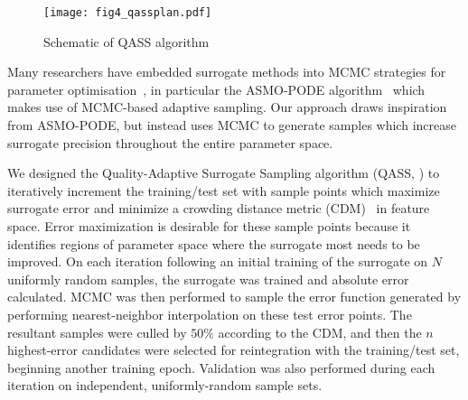 \begin{figure}
	\centering
	\hspace*{-5pt}\texttt{[image: fig4\_qassplan.pdf]}
	\caption{\label{fig:qassplan}Schematic of QASS algorithm}
\end{figure}

Many researchers have embedded surrogate methods into MCMC strategies for
parameter optimisation~\cite{Zhang2020,Gong2017}, in particular the ASMO-PODE
algorithm~\cite{Ginting2011} which makes use of MCMC-based adaptive sampling. Our approach draws inspiration from ASMO-PODE, but instead uses MCMC to generate samples
which increase surrogate precision throughout the entire parameter space.

We designed the Quality-Adaptive Surrogate Sampling algorithm (QASS, ) to iteratively increment the training/test set with sample
points which maximize surrogate error and minimize a crowding distance metric
(CDM)~\cite{Solonen2012} in feature space. Error maximization is desirable for these sample points because it identifies regions of parameter space where the surrogate most needs to be improved. On each iteration following an initial training of the surrogate on $N$ uniformly random samples, the surrogate was trained and absolute error calculated. MCMC was then performed to sample the error function generated by performing nearest-neighbor interpolation on these test error points. The resultant samples were culled by $50\%$ according to the CDM, and then the $n$ highest-error candidates were selected for reintegration with the training/test set, beginning another training epoch. Validation was also performed during each iteration on independent, uniformly-random sample sets.
